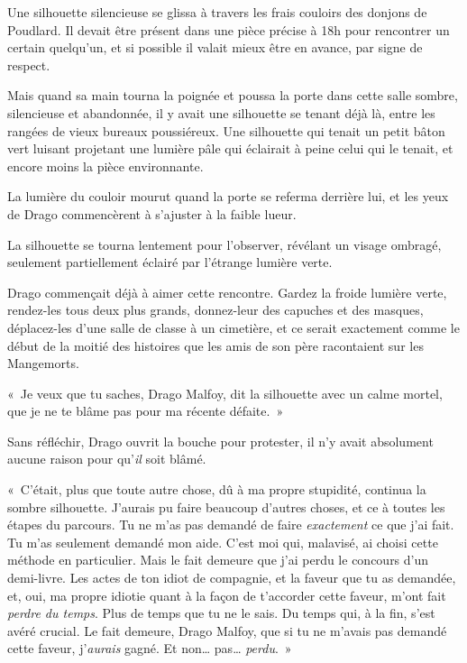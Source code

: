 \later

Une silhouette silencieuse se glissa à travers les frais couloirs des donjons de Poudlard. Il devait être présent dans une pièce précise à 18h pour rencontrer un certain quelqu'un, et si possible il valait mieux être en avance, par signe de respect.

Mais quand sa main tourna la poignée et poussa la porte dans cette salle sombre, silencieuse et abandonnée, il y avait une silhouette se tenant déjà là, entre les rangées de vieux bureaux poussiéreux. Une silhouette qui tenait un petit bâton vert luisant projetant une lumière pâle qui éclairait à peine celui qui le tenait, et encore moins la pièce environnante.

La lumière du couloir mourut quand la porte se referma derrière lui, et les yeux de Drago commencèrent à s'ajuster à la faible lueur.

La silhouette se tourna lentement pour l'observer, révélant un visage ombragé, seulement partiellement éclairé par l'étrange lumière verte.

Drago commençait déjà à aimer cette rencontre. Gardez la froide lumière verte, rendez-les tous deux plus grands, donnez-leur des capuches et des masques, déplacez-les d'une salle de classe à un cimetière, et ce serait exactement comme le début de la moitié des histoires que les amis de son père racontaient sur les Mangemorts.

«~Je veux que tu saches, Drago Malfoy, dit la silhouette avec un calme mortel, que je ne te blâme pas pour ma récente défaite.~»

Sans réfléchir, Drago ouvrit la bouche pour protester, il n'y avait absolument aucune raison pour qu'\emph{il} soit blâmé.

«~C'était, plus que toute autre chose, dû à ma propre stupidité, continua la sombre silhouette. J'aurais pu faire beaucoup d'autres choses, et ce à toutes les étapes du parcours. Tu ne m'as pas demandé de faire \emph{exactement} ce que j'ai fait. Tu m'as seulement demandé mon aide. C'est moi qui, malavisé, ai choisi cette méthode en particulier. Mais le fait demeure que j'ai perdu le concours d'un demi-livre. Les actes de ton idiot de compagnie, et la faveur que tu as demandée, et, oui, ma propre idiotie quant à la façon de t'accorder cette faveur, m'ont fait \emph{perdre du temps}. Plus de temps que tu ne le sais. Du temps qui, à la fin, s'est avéré crucial. Le fait demeure, Drago Malfoy, que si tu ne m'avais pas demandé cette faveur, j'\emph{aurais} gagné. Et non… pas… \emph{perdu}.~»

